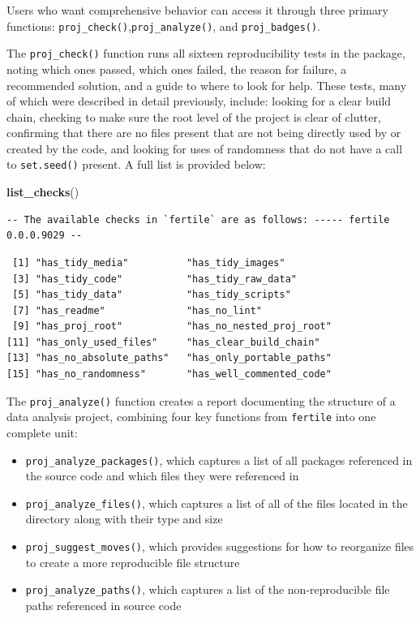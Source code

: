 \documentclass[12pt,twoside]{reedthesis}
\newenvironment{Shaded}{\begin{snugshade}}{\end{snugshade}}
\newcommand{\KeywordTok}[1]{\textcolor[rgb]{0.13,0.29,0.53}{\textbf{#1}}}
\newcommand{\NormalTok}[1]{#1}
\providecommand{\tightlist}{%
  \setlength{\itemsep}{0pt}\setlength{\parskip}{0pt}}
\begin{document}
Users who want comprehensive behavior can access it through three
primary functions: \texttt{proj\_check()},\texttt{proj\_analyze()}, and
\texttt{proj\_badges()}.

The \texttt{proj\_check()} function runs all sixteen reproducibility
tests in the package, noting which ones passed, which ones failed, the
reason for failure, a recommended solution, and a guide to where to look
for help. These tests, many of which were described in detail
previously, include: looking for a clear build chain, checking to make
sure the root level of the project is clear of clutter, confirming that
there are no files present that are not being directly used by or
created by the code, and looking for uses of randomness that do not have
a call to \texttt{set.seed()} present. A full list is provided below:
\begin{Shaded}
\begin{Highlighting}[]
\KeywordTok{list_checks}\NormalTok{()}
\end{Highlighting}
\end{Shaded}
\begin{verbatim}
-- The available checks in `fertile` are as follows: ----- fertile 0.0.0.9029 --
\end{verbatim}
\begin{verbatim}
 [1] "has_tidy_media"          "has_tidy_images"        
 [3] "has_tidy_code"           "has_tidy_raw_data"      
 [5] "has_tidy_data"           "has_tidy_scripts"       
 [7] "has_readme"              "has_no_lint"            
 [9] "has_proj_root"           "has_no_nested_proj_root"
[11] "has_only_used_files"     "has_clear_build_chain"  
[13] "has_no_absolute_paths"   "has_only_portable_paths"
[15] "has_no_randomness"       "has_well_commented_code"
\end{verbatim}
The \texttt{proj\_analyze()} function creates a report documenting the
structure of a data analysis project, combining four key functions from
\texttt{fertile} into one complete unit:
\begin{itemize}
\tightlist
\item
  \texttt{proj\_analyze\_packages()}, which captures a list of all
  packages referenced in the source code and which files they were
  referenced in
\item
  \texttt{proj\_analyze\_files()}, which captures a list of all of the
  files located in the directory along with their type and size
\item
  \texttt{proj\_suggest\_moves()}, which provides suggestions for how to
  reorganize files to create a more reproducible file structure
\item
  \texttt{proj\_analyze\_paths()}, which captures a list of the
  non-reproducible file paths referenced in source code
\end{itemize}
\end{document}
